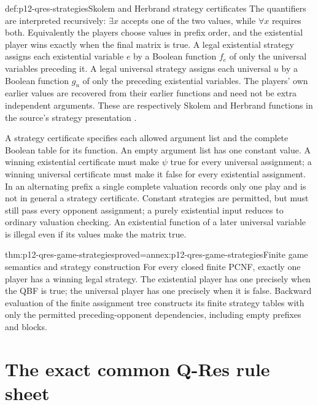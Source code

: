 \begin{hbdefinition}{def:p12-qres-strategies}{Skolem and Herbrand strategy certificates}
The quantifiers are interpreted recursively: \(\exists x\) accepts one of
the two values, while \(\forall x\) requires both.  Equivalently the players
choose values in prefix order, and the existential player wins exactly when
the final matrix is true.  A legal existential strategy assigns each
existential variable \(e\) by a Boolean function \(f_e\) of only the
universal variables preceding it.  A legal universal strategy assigns each
universal \(u\) by a Boolean function \(g_u\) of only the preceding
existential variables.  The players' own earlier values are recovered from
their earlier functions and need not be extra independent arguments.
These are respectively Skolem and Herbrand functions in the source's
strategy presentation \cite[Sec.~2.2]{BeyersdorffEtAl2021QBFJulyAuthor}.

A strategy certificate specifies each allowed argument list and the complete
Boolean table for its function.  An empty argument list has one constant
value.  A winning existential certificate must make \(\psi\) true for
every universal assignment; a winning universal certificate must make it
false for every existential assignment.  In an alternating prefix a single
complete valuation records only one play and is not in general a strategy
certificate.  Constant strategies are permitted, but must still pass every
opponent assignment; a purely existential input reduces to ordinary valuation
checking.  An existential function of a later universal variable is illegal
even if its values make the matrix true.
\end{hbdefinition}

\begin{hbtheorem}{thm:p12-qres-game-strategies}{proved=annex:p12-qres-game-strategies}{Finite game semantics and strategy construction}
For every closed finite PCNF, exactly one player has a winning legal strategy.
The existential player has one precisely when the QBF is true; the universal
player has one precisely when it is false.  Backward evaluation of the finite
assignment tree constructs its finite strategy tables with only the permitted
preceding-opponent dependencies, including empty prefixes and blocks.
\end{hbtheorem}

\section{The exact common Q-Res rule sheet}

